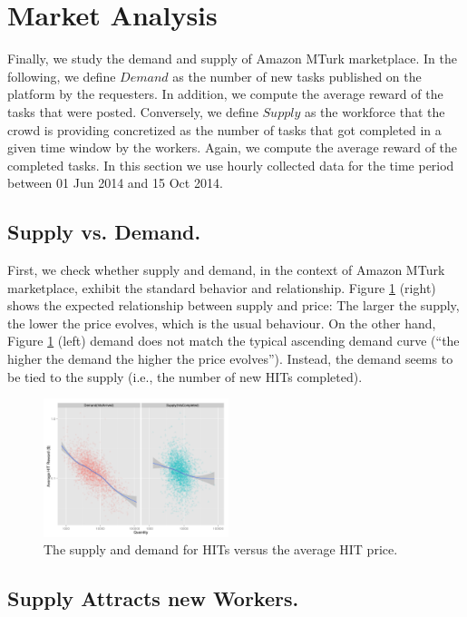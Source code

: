 \section{Market Analysis}
\label{sec:market}
Finally, we study the demand and supply of Amazon MTurk marketplace. In the following, we define $Demand$ as the number of new tasks published on the platform by the requesters. In addition, we compute the average reward of the tasks that were posted. Conversely, we define $Supply$ as the workforce that the crowd is providing concretized as the number of tasks that got completed in a given time window by the workers. Again, we compute the average reward of the completed tasks.
In this section we use hourly collected data for the time period between 01 Jun 2014 and 15 Oct 2014.

\subsection{Supply vs. Demand.}
First, we check whether supply and demand, in the context of Amazon MTurk marketplace, exhibit the standard behavior and relationship.
Figure \ref{fig:dsup} (right) shows the expected relationship between supply and price: The larger the supply, the lower the price evolves, which is the usual behaviour. On the other hand, Figure \ref{fig:dsup} (left) demand does not match the typical ascending demand curve (``the higher the demand the higher the price evolves''). Instead, the demand seems to be tied to the supply (i.e., the number of new HITs completed).

\begin{figure}[tb]
	\centering
		\includegraphics[width=0.48\textwidth]{figures/ds}
	\caption{The supply and demand for HITs versus the average HIT price.}
	\label{fig:dsup}
\end{figure}

\subsection{Supply Attracts new Workers.} %

